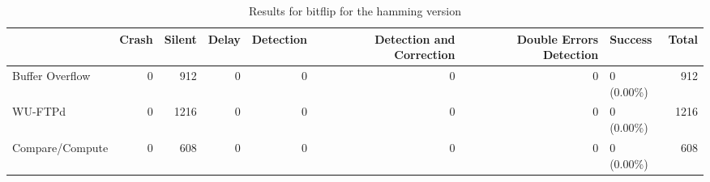 \begin{table}[t]
	\centering
	\caption{Results for bitflip for the hamming version}
	\label{table:end_sim_by_status_hamming_1_bitflip}
	\begin{tabular}{lrrrrrrlr}
		\toprule
		                & Crash & Silent & Delay & Detection & Detection and Correction & Double Errors Detection & Success    & Total \\
		\midrule
		Buffer Overflow & 0     & 912    & 0     & 0         & 0                        & 0                       & 0 (0.00\%) & 912   \\
		WU-FTPd         & 0     & 1216   & 0     & 0         & 0                        & 0                       & 0 (0.00\%) & 1216  \\
		Compare/Compute & 0     & 608    & 0     & 0         & 0                        & 0                       & 0 (0.00\%) & 608   \\
		\bottomrule
	\end{tabular}
\end{table}

